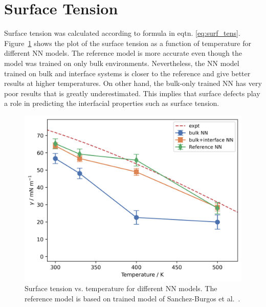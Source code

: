 \section{Surface Tension}
Surface tension was calculated according to formula in eqtn.
\eqref{eq:surf_tens}. Figure~\ref{fig:surf_tens} shows the plot of the surface
tension as a function of temperature for different NN models. The reference
model is more accurate even though the model was trained on only bulk
environments. Nevertheless, the NN model trained on bulk and interface systems
is closer to the reference and give better results at higher temperatures. On
other hand, the bulk-only trained NN has very poor results that is greatly
underestimated. This implies that surface defects play a role in predicting
the interfacial
properties such as surface tension.

\begin{figure}[h!]
	\centering
	\includegraphics[width=0.7\linewidth]{images/surface_tension.png}
	\caption{Surface tension vs. temperature for different NN models. The
		reference model is based on trained model of Sanchez-Burgos et
		al.~\cite{sanchez2023deep}.  }
	\label{fig:surf_tens}
\end{figure}


